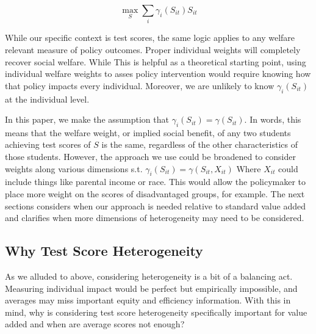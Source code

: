 \documentclass{article}
\theoremstyle{definition}
\theoremstyle{definition}
\theoremstyle{definition}
\theoremstyle{definition}
\begin{document}
    \begin{equation}
       \max_S \sum_i \gamma_i(S_{it}) S_{it}
    \end{equation}
    
    While our specific context is test scores, the same logic applies to any welfare relevant measure of policy outcomes. Proper individual weights will completely recover social welfare. While This is helpful as a theoretical starting point, using individual welfare weights to asses  policy intervention would require knowing how that policy impacts every individual. Moreover, we are unlikely to know $\gamma_i(S_{it})$ at the individual level.
    
    In this paper, we make the assumption that $\gamma_i(S_{it}) = \gamma(S_{it})$. In words, this means that the welfare weight, or implied social benefit, of any two students achieving test scores of $S$ is the same, regardless of the other characteristics of those students. However, the approach we use could be broadened to consider weights along various dimensions s.t. $\gamma_i(S_{it}) = \gamma(S_{it}, X_{it})$ Where $X_{it}$ could include things like parental income or race. This would allow the policymaker to place more weight on the scores of disadvantaged groups, for example. The next sections considers when our approach is needed relative to standard value added and clarifies when more dimensions of heterogeneity may need to be considered. 
    
    
    \subsection{Why Test Score Heterogeneity}
    
    
    As we alluded to above, considering heterogeneity is a bit of a balancing act. Measuring individual impact would be perfect but empirically impossible, and averages may miss important equity and efficiency information. With this in mind, why is considering test score heterogeneity specifically important for value added and when are average scores not enough? 
    
\end{document}
